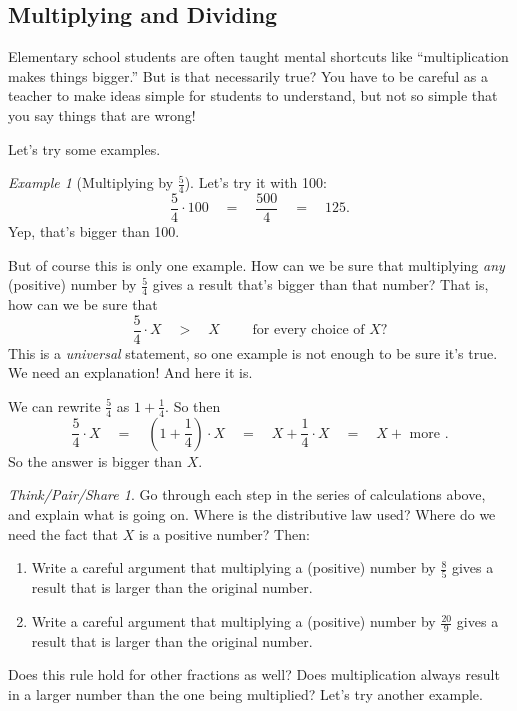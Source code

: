 \documentclass[10pt, reqno]{amsart}
\theoremstyle{remark}
\newtheorem{example}[thm]{Example}
\newtheorem*{thinkpair*}{Think/Pair/Share}
\theoremstyle{definition}
\numberwithin{equation}{section}  %
\begin{document}
\subsection{Multiplying and Dividing}
Elementary school students are often taught mental shortcuts like ``multiplication makes things bigger.''  But is that necessarily true?  You have to be careful as a teacher to make ideas simple for students to understand, but not so simple that you say things that are wrong!

Let's try some examples.

\begin{example}[Multiplying by $\frac 5 4$]
Let's try it with 100:
\[
\frac 5 4 \cdot 100 
\quad
= 
\quad
\frac{500}4 
\quad
= 
\quad
125.
\]
Yep, that's bigger than 100.  
\end{example}

But of course this is only one example.  How can we be sure that multiplying \emph{any}  (positive)  number by $\frac 5 4$ gives a result that's bigger than that number?  That is, how can we be sure that
\[
\frac 5 4 \cdot X
\quad
 > 
 \quad
 X \qquad \text{ for every choice of } X?
\]
This is a \emph{universal} statement, so one example is not enough to be sure it's true.  We need an explanation!  And here it is.

We can rewrite $\frac 54$ as $1 + \frac 14$.  So then
\[
\frac 5 4 \cdot X 
\quad
=
\quad
\left(1 + \frac 1 4\right)\cdot X
\quad
=
\quad
X + \frac 1 4 \cdot X 
\quad 
=
\quad
X + \text{ more }.
\]
So the answer is bigger than $X$.

\begin{thinkpair*}
Go through each step in the series of calculations above, and explain what is going on.  Where is the distributive law used?  Where do we need the fact that $X$ is a positive number?  Then:
\begin{enumerate}
\item
Write a careful argument that multiplying a (positive) number by $\frac 8 5$ gives a result that is larger than the original number.\\
\item
 Write a careful argument that multiplying a (positive) number by $\frac {20} 9$ gives a result that is larger than the original number.\\
 \end{enumerate}

\end{thinkpair*}

Does this rule hold for other fractions as well?  Does multiplication always result in a larger number than the one being multiplied?  Let's try another example.
\end{document}
